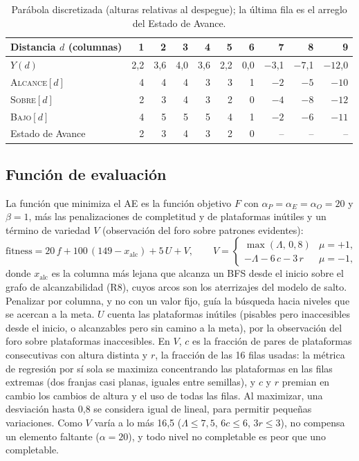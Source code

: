 \documentclass[letter, 10pt]{article}
\begin{document}
\begin{table}[!htb]
\centering\footnotesize\setlength{\tabcolsep}{5pt}
\begin{tabular}{lrrrrrrrrr}
\toprule
Distancia $d$ (columnas) & 1 & 2 & 3 & 4 & 5 & 6 & 7 & 8 & 9\\
\midrule
$Y(d)$ & 2,2 & 3,6 & 4,0 & 3,6 & 2,2 & 0,0 & $-3$,1 & $-7$,1 & $-12$,0\\
\textsc{Alcance}$[d]$ & 4 & 4 & 4 & 3 & 3 & 1 & $-2$ & $-5$ & $-10$\\
\textsc{Sobre}$[d]$ & 2 & 3 & 4 & 3 & 2 & 0 & $-4$ & $-8$ & $-12$\\
\textsc{Bajo}$[d]$ & 4 & 5 & 5 & 5 & 4 & 1 & $-2$ & $-6$ & $-11$\\
\midrule
Estado de Avance & 2 & 3 & 4 & 3 & 2 & 0 & -- & -- & --\\
\bottomrule
\end{tabular}
\caption{Par\'abola discretizada (alturas relativas al despegue); la \'ultima fila es el arreglo del Estado de Avance.}\label{tab:salto}
\end{table}

\subsection{Funci\'on de evaluaci\'on}\label{sec:eval}
La funci\'on que minimiza el AE es la funci\'on objetivo $F$ con $\alpha_P=\alpha_E=\alpha_O=20$ y $\beta=1$, m\'as las penalizaciones de completitud y de plataformas in\'utiles y un t\'ermino de variedad $V$ (observaci\'on del foro sobre patrones evidentes):
\[ \text{fitness}=20\,f+100\,(149-x_{\text{alc}})+5\,U+V,\qquad V=\begin{cases}\max(\Lambda,\,0{,}8) & \mu=+1,\\ -\Lambda-6\,c-3\,r & \mu=-1,\end{cases} \]
donde $x_{\text{alc}}$ es la columna m\'as lejana que alcanza un BFS desde el inicio sobre el grafo de alcanzabilidad (R8), cuyos arcos son los aterrizajes del modelo de salto. Penalizar por columna, y no con un valor fijo, gu\'ia la b\'usqueda hacia niveles que se acercan a la meta. $U$ cuenta las plataformas in\'utiles (pisables pero inaccesibles desde el inicio, o alcanzables pero sin camino a la meta), por la observaci\'on del foro sobre plataformas inaccesibles. En $V$, $c$ es la fracci\'on de pares de plataformas consecutivas con altura distinta y $r$, la fracci\'on de las 16 filas usadas: la m\'etrica de regresi\'on por s\'i sola se maximiza concentrando las plataformas en las filas extremas (dos franjas casi planas, iguales entre semillas), y $c$ y $r$ premian en cambio los cambios de altura y el uso de todas las filas. Al maximizar, una desviaci\'on hasta 0,8 se considera igual de lineal, para permitir peque\~nas variaciones. Como $V$ var\'ia a lo m\'as 16,5 ($\Lambda\le7{,}5$, $6c\le6$, $3r\le3$), no compensa un elemento faltante ($\alpha=20$), y todo nivel no completable es peor que uno completable.
\end{document}
